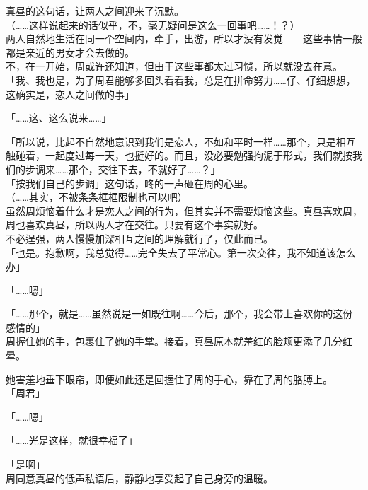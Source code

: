 真昼的这句话，让两人之间迎来了沉默。\\

（……这样说起来的话似乎，不，毫无疑问是这么一回事吧……！？）\\

两人自然地生活在同一个空间内，牵手，出游，所以才没有发觉——这些事情一般都是亲近的男女才会去做的。\\

不，在一开始，周或许还知道，但由于这些事都太过习惯，所以就没去在意。\\

「我、我也是，为了周君能够多回头看看我，总是在拼命努力……仔、仔细想想，这确实是，恋人之间做的事」

「……这、这么说来……」

「所以说，比起不自然地意识到我们是恋人，不如和平时一样……那个，只是相互触碰着，一起度过每一天，也挺好的。而且，没必要勉强拘泥于形式，我们就按我们的步调来……那个，交往下去，不就好了……？」\\

「按我们自己的步调」这句话，咚的一声砸在周的心里。\\

（……其实，不被条条框框限制也可以吧）\\

虽然周烦恼着什么才是恋人之间的行为，但其实并不需要烦恼这些。真昼喜欢周，周也喜欢真昼，所以两人才在交往。只要有这个事实就好。\\

不必逞强，两人慢慢加深相互之间的理解就行了，仅此而已。\\

「也是。抱歉啊，我总觉得……完全失去了平常心。第一次交往，我不知道该怎么办」

「……嗯」

「……那个，就是……虽然说是一如既往啊……今后，那个，我会带上喜欢你的这份感情的」\\

周握住她的手，包裹住了她的手掌。接着，真昼原本就羞红的脸颊更添了几分红晕。

她害羞地垂下眼帘，即便如此还是回握住了周的手心，靠在了周的胳膊上。\\

「周君」

「……嗯」

「……光是这样，就很幸福了」

「是啊」\\

周同意真昼的低声私语后，静静地享受起了自己身旁的温暖。\\
